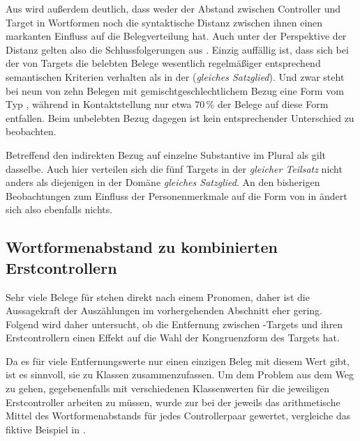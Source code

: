 Aus  wird außerdem deutlich, dass weder der Abstand
zwischen Controller und Target in Wortformen noch die
syntaktische Distanz zwischen ihnen einen markanten
Einfluss auf die Belegverteilung hat. Auch unter der Perspektive der Distanz
gelten also die Schlussfolgerungen aus .
Einzig auffällig ist, dass sich bei der  von Targets die
belebten Belege wesentlich regelmäßiger entsprechend semantischen
Kriterien verhalten als in der  (\emph{gleiches
Satzglied}). Und zwar steht bei neun von zehn Belegen mit
gemischtgeschlechtlichem Bezug eine Form vom Typ , während in
Kontaktstellung nur etwa 70\,\% der Belege auf diese Form entfallen. Beim
unbelebten Bezug dagegen ist kein entsprechender Unterschied zu
beobachten.

Betreffend den indirekten Bezug auf einzelne Substantive im Plural als
 gilt dasselbe. Auch hier verteilen sich die fünf Targets
in der  \emph{gleicher Teilsatz} nicht anders als diejenigen in der
Domäne \emph{gleiches Satzglied}. An den bisherigen Beobachtungen zum Einfluss
der Personenmerkmale auf die Form von  in
 ändert sich also ebenfalls nichts.


\subsection{Wortformenabstand zu kombinierten Erstcontrollern}

Sehr viele Belege für  stehen direkt nach einem Pronomen, daher ist
die Aussagekraft der Auszählungen im vorhergehenden Abschnitt eher gering.
Folgend wird daher untersucht, ob die Entfernung zwischen
-Targets und ihren Erstcontrollern einen Effekt auf die Wahl der
Kongruenzform des Targets hat.

Da es für viele Entfernungswerte nur einen einzigen Beleg mit
diesem Wert gibt, ist es sinnvoll, sie zu Klassen zusammenzufassen. Um dem
Problem aus dem Weg zu gehen, gegebenenfalls mit verschiedenen Klassenwerten
für die jeweiligen Erstcontroller arbeiten zu müssen, wurde zur
 bei der  jeweils das
arithmetische Mittel des Wortformenabstands für jedes Controllerpaar gewertet,
vergleiche das fiktive Beispiel in .

